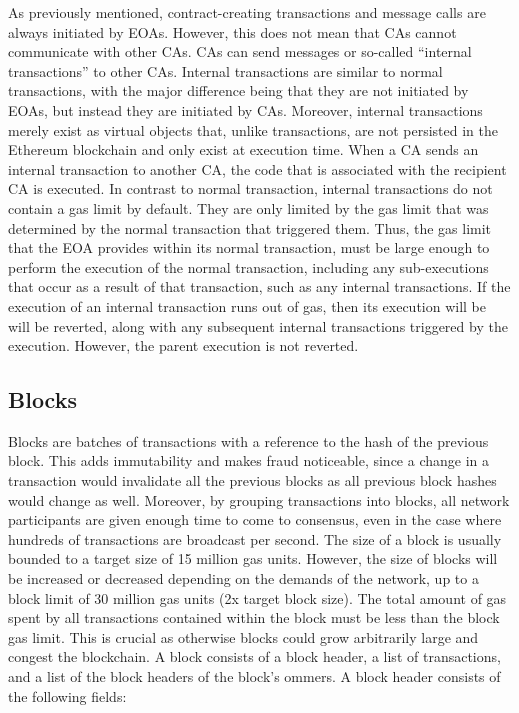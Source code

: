            As previously mentioned, contract-creating transactions and message calls are always initiated by EOAs.
            However, this does not mean that CAs cannot communicate with other CAs.
            CAs can send messages or so-called “internal transactions” to other CAs.
            Internal transactions are similar to normal transactions, with the major difference being that they are not initiated by EOAs, but instead they are initiated by CAs.
            Moreover, internal transactions merely exist as virtual objects that, unlike transactions, are not persisted in the Ethereum blockchain and only exist at execution time.
            When a CA sends an internal transaction to another CA, the code that is associated with the recipient CA is executed.
            In contrast to normal transaction, internal transactions do not contain a gas limit by default.
            They are only limited by the gas limit that was determined by the normal transaction that triggered them.
            Thus, the gas limit that the EOA provides within its normal transaction, must be large enough to perform the execution of the normal transaction, including any sub-executions that occur as a result of that transaction, such as any internal transactions.
            If the execution of an internal transaction runs out of gas, then its execution will be will be reverted, along with any subsequent internal transactions triggered by the execution.
            However, the parent execution is not reverted.


    \subsection{Blocks}

        Blocks are batches of transactions with a reference to the hash of the previous block.
        This adds immutability and makes fraud noticeable, since a change in a transaction would invalidate all the previous blocks as all previous block hashes would change as well.
        Moreover, by grouping transactions into blocks, all network participants are given enough time to come to consensus, even in the case where hundreds of transactions are broadcast per second.
        The size of a block is usually bounded to a target size of 15 million gas units.
        However, the size of blocks will be increased or decreased depending on the demands of the network, up to a block limit of 30 million gas units (2x target block size).
        The total amount of gas spent by all transactions contained within the block must be less than the block gas limit.
        This is crucial as otherwise blocks could grow arbitrarily large and congest the blockchain.
        A block consists of a block header, a list of transactions, and a list of the block headers of the block's ommers.
        A block header consists of the following fields:

